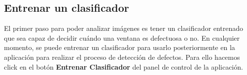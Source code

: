 \subsection{Entrenar un clasificador}
El primer paso para poder analizar imágenes es tener un clasificador entrenado que sea capaz de decidir cuándo una ventana es defectuosa o no. En cualquier momento, se puede entrenar un clasificador para usarlo posteriormente en la aplicación para realizar el proceso de detección de defectos. Para ello hacemos click en el botón \textbf{Entrenar Clasificador} del panel de control de la aplicación.
